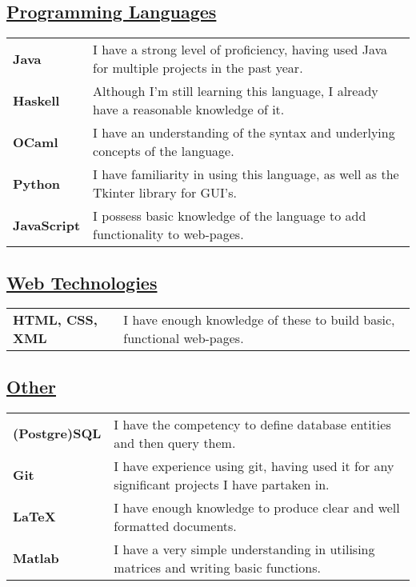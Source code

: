 \documentclass[11pt]{article}
\begin{document}
		\subsection*{\underline{Programming Languages}}
		\renewcommand{\arraystretch}{1.5}%
		\begin{tabular}[20pt]{ll}
			 \textbf{Java} &  I have a strong level of proficiency, having used Java for multiple projects in the past year.\\
			 \textbf{Haskell} & Although I'm still learning this language, I already have a reasonable knowledge of it.\\
			 \textbf{OCaml} & I have an understanding of the syntax and underlying concepts of the language.\\
			 \textbf{Python} & I have familiarity in using this language, as well as the Tkinter library for GUI's. \\
			\textbf{JavaScript} &  I possess basic knowledge of the language to add functionality to web-pages.\\
		\end{tabular} 
		\subsection*{\underline{Web Technologies}}
		\renewcommand{\arraystretch}{1.5}%
		\begin{tabular}{ll}
			\textbf{HTML, CSS, XML} & I have enough knowledge of these to build basic, functional web-pages.\\
		\end{tabular}
		\subsection*{\underline{Other}}
		\renewcommand{\arraystretch}{1.5}%
		\begin{tabular}{ll}
			\textbf{(Postgre)SQL} & I have the competency to define database entities and then query them.\\
			 \textbf{Git} & I have experience using git, having used it for any significant projects I have partaken in.\\
			\textbf{LaTeX} & I have enough knowledge to produce clear and well formatted documents.\\
			\textbf{Matlab} & I have a very simple understanding in utilising matrices and writing basic functions.\\
		\end{tabular}
\end{document}
